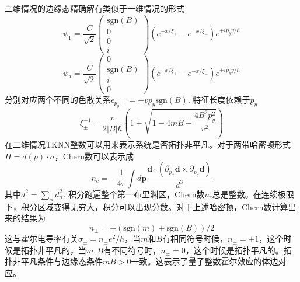 \documentclass{article}
\numberwithin{equation}{subsection}
\begin{document}
二维情况的边缘态精确解有类似于一维情况的形式
\begin{equation}
    \psi_{1}=\frac{C}{\sqrt{2}}\left(\begin{array}{c}
        \mathrm{sgn}(B) \\
        0 \\
        0 \\
        i
        \end{array}\right)\left(e^{-x / \xi_{+}}-e^{-x / \xi_{-}}\right) e^{+i p_{y} y / \hbar}
\end{equation}
\begin{equation}
    \psi_{2}=\frac{C}{\sqrt{2}}\left(\begin{array}{c}
        0 \\
        \mathrm{sgn}(B) \\
        i \\
        0
        \end{array}\right)\left(e^{-x / \xi_{+}}-e^{-x / \xi_{-}}\right) e^{+i p_{y} y / \hbar}
\end{equation}
分别对应两个不同的色散关系$\epsilon_{p_y\pm}=\pm vp_y\mathrm{sgn}(B)$. 特征长度依赖于$p_y$
\begin{equation}
    \xi_{\pm}^{-1}=\frac{v}{2|B|\hbar}\left(1\pm\sqrt{1-4mB+\frac{4B^2p_y^2}{v^2}}\right)
\end{equation}
在二维情况TKNN整数可以用来表示系统是否拓扑非平凡。对于两带哈密顿形式$H=d(p)\cdot\sigma$，Chern数可以表示成
\begin{equation}
    n_{c}=-\frac{1}{4 \pi} \int d \mathbf{p} \frac{\mathbf{d} \cdot\left(\partial_{p_{x}} \mathbf{d} \times \partial_{p_{y}} \mathbf{d}\right)}{d^{3}}
\end{equation}
其中$d^2=\sum_{\alpha}d_\alpha^2$. 积分跑遍整个第一布里渊区，Chern数$n_c$总是整数。在连续极限下，积分区域变得无穷大，积分可以出现分数。对于上述哈密顿，Chern数计算出来的结果为
\begin{equation}
    n_{\pm}=\pm(\mathrm{sgn}(m)+\mathrm{sgn}(B))/2
\end{equation}
这与霍尔电导率有关$\sigma_\pm=n_\pm e^2/h$，当$m$和$B$有相同符号时候，$n_\pm=\pm1$，这个时候是拓扑非平凡的，当$m,B$有不同符号时，$n_\pm=0$，这个时候是拓扑平凡的。拓扑非平凡条件与边缘态条件$mB>0$一致。这表示了量子整数霍尔效应的体边对应。
\end{document}
